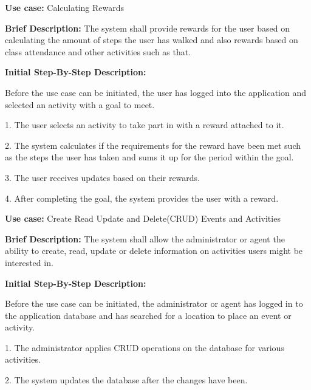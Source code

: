 \documentclass{article}
\begin{document}
\begin{flushleft}
    \textbf{Use case:} Calculating Rewards  
    \newline
    	
    \textbf{Brief Description:}
    \newline
    The system shall provide rewards for the user based on calculating the amount of steps the user has walked and also rewards based on class attendance and other activities such as that.
    \newline
    
    \textbf{Initial Step-By-Step Description:}
    
    Before the use case can be initiated, the user has logged into the application and selected an activity with a goal to meet.
	\newline    
	
1. The user selects an activity to take part in with a reward attached to it.

2. The system calculates if the requirements for the reward have been met such as the steps the user has taken and sums it up for the period within the goal. 

3. The user receives updates based on their rewards.

4. After completing the goal, the system provides the user with a reward.


\end{flushleft}

\begin{flushleft}
    \textbf{Use case:} Create Read Update and Delete(CRUD) Events and Activities  
    \newline
    	
    \textbf{Brief Description:}
    \newline
    The system shall allow the administrator or agent the ability to create, read, update or delete information on activities users might be interested in. 
    \newline
    
    \textbf{Initial Step-By-Step Description:}
    
    Before the use case can be initiated, the administrator or agent has logged in to the application database and has searched for a location to place an event or activity.
	\newline    

1. The administrator applies CRUD operations on the database for various activities.

2. The system updates the database after the changes have been.

\end{flushleft}
\end{document}
